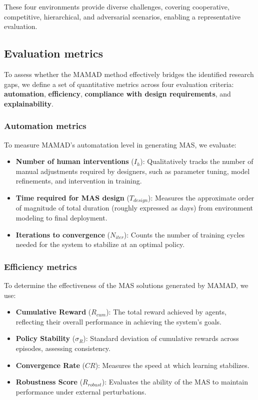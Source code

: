 \documentclass[pdflatex,sn-mathphys-num]{sn-jnl}%
\theoremstyle{thmstyleone}%
\theoremstyle{thmstyletwo}%
\theoremstyle{thmstylethree}%
\begin{document}
\noindent These four environments provide diverse challenges, covering cooperative, competitive, hierarchical, and adversarial scenarios, enabling a representative evaluation.


\subsection{Evaluation metrics}

To assess whether the MAMAD method effectively bridges the identified research gaps, we define a set of quantitative metrics across four evaluation criteria: \textbf{automation}, \textbf{efficiency}, \textbf{compliance with design requirements}, and \textbf{explainability}.

\subsubsection{Automation metrics}
To measure MAMAD's automatation level in generating MAS, we evaluate:
\begin{itemize}
    \item \textbf{Number of human interventions} ($I_h$): Qualitatively tracks the number of manual adjustments required by designers, such as parameter tuning, model refinements, and intervention in training.
    \item \textbf{Time required for MAS design} ($T_{design}$): Measures the approximate order of magnitude of total duration (roughly expressed as days) from environment modeling to final deployment.
    \item \textbf{Iterations to convergence} ($N_{iter}$): Counts the number of training cycles needed for the system to stabilize at an optimal policy.
\end{itemize}

\subsubsection{Efficiency metrics}
To determine the effectiveness of the MAS solutions generated by MAMAD, we use:
\begin{itemize}
    \item \textbf{Cumulative Reward} ($R_{cum}$): The total reward achieved by agents, reflecting their overall performance in achieving the system's goals.
    \item \textbf{Policy Stability} ($\sigma_R$): Standard deviation of cumulative rewards across episodes, assessing consistency.
    \item \textbf{Convergence Rate} ($CR$): Measures the speed at which learning stabilizes.
    \item \textbf{Robustness Score} ($R_{robust}$): Evaluates the ability of the MAS to maintain performance under external perturbations.
\end{itemize}
\end{document}
